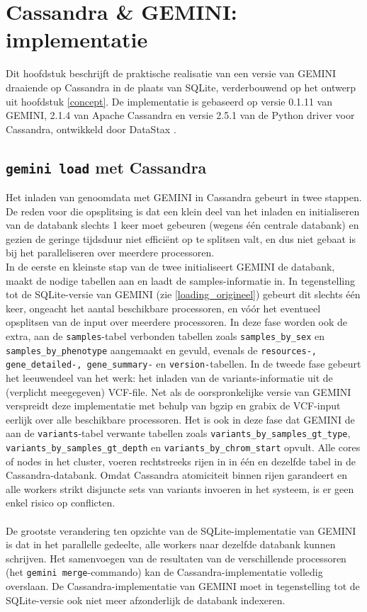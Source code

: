 \chapter{Cassandra \& GEMINI: implementatie}
\label{implementatie}

Dit hoofdstuk beschrijft de praktische realisatie van een versie van GEMINI draaiende op Cassandra in de plaats van SQLite, verderbouwend op het ontwerp uit hoofdstuk \ref{concept}. De implementatie is gebaseerd op versie 0.1.11 van GEMINI, 2.1.4 van Apache Cassandra en versie 2.5.1 van de Python driver voor Cassandra, ontwikkeld door DataStax \cite{cassandra_driver}. 

\section{\texttt{gemini load} met Cassandra}
Het inladen van genoomdata met GEMINI in Cassandra gebeurt in twee stappen. De reden voor die opsplitsing is dat een klein deel van het inladen en initialiseren van de databank slechts 1 keer moet gebeuren (wegens \'e\'en centrale databank) en gezien de geringe tijdsduur niet effici\"ent op te splitsen valt, en dus niet gebaat is bij het paralleliseren over meerdere processoren. \\In de eerste en kleinste stap van de twee initialiseert GEMINI de databank, maakt de nodige tabellen aan en laadt de samples-informatie in. In tegenstelling tot de SQLite-versie van GEMINI (zie \ref{loading_origineel}) gebeurt dit slechts \'e\'en keer, ongeacht het aantal beschikbare processoren, en v\'o\'or het eventueel opsplitsen van de input over meerdere processoren. In deze fase worden ook de extra, aan de \texttt{samples}-tabel verbonden tabellen zoals \texttt{samples\_by\_sex} en \texttt{samples\_by\_phenotype} aangemaakt en gevuld, evenals de \texttt{resources-, gene\_detailed-, gene\_summary-} en \texttt{version-}tabellen.
In de tweede fase gebeurt het leeuwendeel van het werk: het inladen van de variants-informatie uit de (verplicht meegegeven) VCF-file. Net als de oorspronkelijke versie van GEMINI verspreidt deze implementatie met behulp van bgzip \cite{bgzip} en grabix \cite{grabix} de VCF-input eerlijk over alle beschikbare processoren. Het is ook in deze fase dat GEMINI de aan de \texttt{variants}-tabel verwante tabellen zoals \texttt{variants\_by\_samples\_gt\_type}, \texttt{variants\_by\_samples\_gt\_depth} en \texttt{variants\_by\_chrom\_start} opvult. Alle cores of nodes in het cluster, voeren rechtstreeks rijen in in \'e\'en en dezelfde tabel in de Cassandra-databank. Omdat Cassandra atomiciteit binnen rijen garandeert en alle workers strikt disjuncte sets van variants invoeren in het systeem, is er geen enkel risico op conflicten.\\\\
De grootste verandering ten opzichte van de SQLite-implementatie van GEMINI is dat in het parallelle gedeelte, alle workers naar dezelfde databank kunnen schrijven. Het samenvoegen van de resultaten van de verschillende processoren (het \texttt{gemini merge}-commando) kan de Cassandra-implementatie volledig overslaan. De Cassandra-implementatie van GEMINI moet in tegenstelling tot de SQLite-versie ook niet meer afzonderlijk de databank indexeren.

